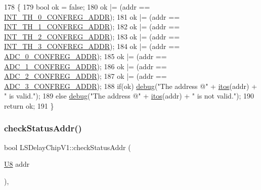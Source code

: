 \begin{DoxyCode}
178     \{
179          \textcolor{keywordtype}{bool} ok = \textcolor{keyword}{false};
180          ok |= (addr == \hyperlink{LSDelayChipV1_8h_a27e55e95b788d2cc312a439198c26971}{INT\_TH\_0\_CONFREG\_ADDR}); 
181          ok |= (addr == \hyperlink{LSDelayChipV1_8h_a771c79d3381641a3bc709f4a69efcc28}{INT\_TH\_1\_CONFREG\_ADDR});
182          ok |= (addr == \hyperlink{LSDelayChipV1_8h_a0a4946654da8e2065cc0b461f99d9bc8}{INT\_TH\_2\_CONFREG\_ADDR});
183          ok |= (addr == \hyperlink{LSDelayChipV1_8h_af8cc01f53a4a2d46901b9f32372ab6ea}{INT\_TH\_3\_CONFREG\_ADDR});     
184          ok |= (addr == \hyperlink{LSDelayChipV1_8h_ad1c6f1ce476a54a95469cd130dffa074}{ADC\_0\_CONFREG\_ADDR}); 
185          ok |= (addr == \hyperlink{LSDelayChipV1_8h_a83aa641dd89900461bdc2ed428f2bce9}{ADC\_1\_CONFREG\_ADDR});
186          ok |= (addr == \hyperlink{LSDelayChipV1_8h_abd577ee5c75174c74fc6886c1eaad80a}{ADC\_2\_CONFREG\_ADDR});
187          ok |= (addr == \hyperlink{LSDelayChipV1_8h_a19e4f86f88864d8c249bd537ef628f92}{ADC\_3\_CONFREG\_ADDR});
188          \textcolor{keywordflow}{if}(ok) \hyperlink{classObject_aac010553f022165573714b7014a15f0d}{debug}(\textcolor{stringliteral}{"The address @"} + \hyperlink{Tools_8h_af330027dbdafb9a30768b3613c553e60}{itos}(addr) + \textcolor{stringliteral}{" is valid."});
189          \textcolor{keywordflow}{else}   \hyperlink{classObject_aac010553f022165573714b7014a15f0d}{debug}(\textcolor{stringliteral}{"The address @"} + \hyperlink{Tools_8h_af330027dbdafb9a30768b3613c553e60}{itos}(addr) + \textcolor{stringliteral}{" is not valid."});
190          \textcolor{keywordflow}{return} ok;           
191     \}
\end{DoxyCode}
\mbox{\label{classLSDelayChipV1_a5083f29a93d38258d9de00dd5a89af99}} 
\subsubsection{\texorpdfstring{check\+Status\+Addr()}{checkStatusAddr()}}
{\footnotesize\ttfamily bool L\+S\+Delay\+Chip\+V1\+::check\+Status\+Addr (\begin{DoxyParamCaption}\item[{\hyperlink{ICECALv3_8h_a3cb25ca6f51f003950f9625ff05536fc}{U8}}]{addr }\end{DoxyParamCaption})\hspace{0.3cm}{\ttfamily [inline]}, {\ttfamily [private]}}



